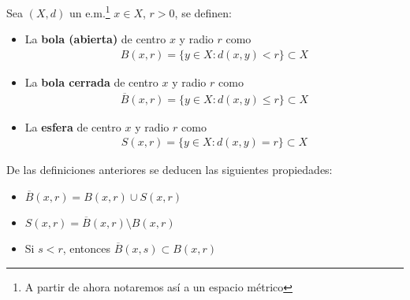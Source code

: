 \begin{definicion}
    Sea $(X,d)$ un e.m.\footnote{A partir de ahora notaremos así a un espacio métrico} $x \in X$, $r >0$, se definen:

    \begin{itemize}
        \item La \textbf{bola (abierta)} de centro $x$ y radio $r$ como 
        \begin{gather*}
            B(x, r) = \{y \in X : d(x,y) < r\} \subset X
        \end{gather*}
        \item La \textbf{bola cerrada} de centro $x$ y radio $r$ como 
        \begin{gather*}
            \overline{B}(x, r) = \{y \in X : d(x,y) \leq r\} \subset X
        \end{gather*}
        \item La \textbf{esfera} de centro $x$ y radio $r$ como 
        \begin{gather*}
            S(x, r) = \{y \in X : d(x,y) = r\} \subset X
        \end{gather*}
    \end{itemize}
    \endsquare
\end{definicion}

\begin{propiedades} De las definiciones anteriores se deducen las siguientes propiedades:
    \begin{itemize}
        \item $\overline{B}(x, r) = B(x,r) \cup S(x,r)$
        \item $S(x,r) = \overline{B}(x, r) \setminus B(x,r)$
        \item Si $s<r$, entonces $\overline{B}(x, s) \subset B(x,r)$
    \end{itemize}
    \endsquare
\end{propiedades}

